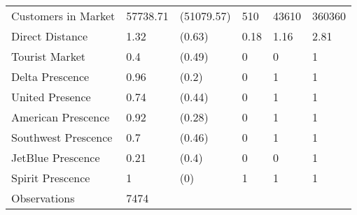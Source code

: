 \begin{tabular}[t]{llllll}
\hspace{1em}Customers in Market & 57738.71 & (51079.57) & 510 & 43610 & 360360\\
\hspace{1em}Direct Distance & 1.32 & (0.63) & 0.18 & 1.16 & 2.81\\
\hspace{1em}Tourist Market & 0.4 & (0.49) & 0 & 0 & 1\\
\hspace{1em}Delta Prescence & 0.96 & (0.2) & 0 & 1 & 1\\
\hspace{1em}United Presence & 0.74 & (0.44) & 0 & 1 & 1\\
\hspace{1em}American Prescence & 0.92 & (0.28) & 0 & 1 & 1\\
\hspace{1em}Southwest Prescence & 0.7 & (0.46) & 0 & 1 & 1\\
\hspace{1em}JetBlue Prescence & 0.21 & (0.4) & 0 & 0 & 1\\
\hspace{1em}Spirit Prescence & 1 & (0) & 1 & 1 & 1\\
\midrule
\hspace{1em}Observations & 7474 &  &  &  & \\
\bottomrule
\end{tabular}
